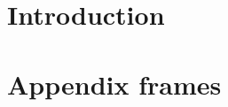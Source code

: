 \documentclass[t]{beamer} \usepackage[czech]{babel} \usepackage[utf8]{inputenc} \usetheme{Frankfurt}
\title[]{}
\author{} \institute{} \date{}
\begin{document}
\section{Introduction}
\begin{frame}[noframenumbering]	\titlepage	\end{frame}


\appendix
\section{Appendix frames} %
\end{document}
